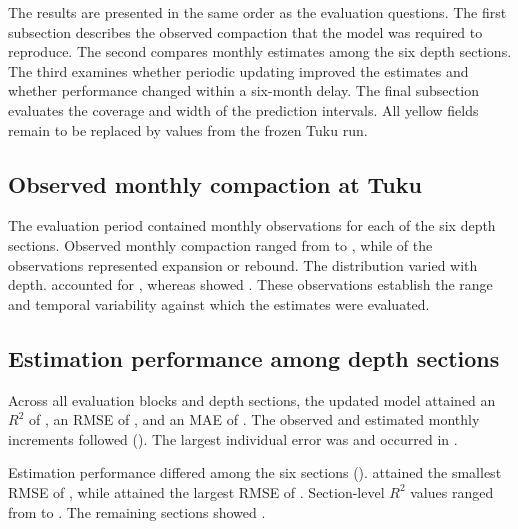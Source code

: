 The results are presented in the same order as the evaluation questions. The first subsection describes the observed compaction that the model was required to reproduce. The second compares monthly estimates among the six depth sections. The third examines whether periodic updating improved the estimates and whether performance changed within a six-month delay. The final subsection evaluates the coverage and width of the prediction intervals. All yellow fields remain to be replaced by values from the frozen Tuku run.

\subsection{Observed monthly compaction at Tuku}
\label{subsec:results_observations}

The evaluation period contained  monthly observations for each of the six depth sections. Observed monthly compaction ranged from  to , while  of the observations represented expansion or rebound. The distribution varied with depth.  accounted for , whereas  showed . These observations establish the range and temporal variability against which the estimates were evaluated.

\subsection{Estimation performance among depth sections}
\label{subsec:results_sections}

Across all evaluation blocks and depth sections, the updated model attained an $R^2$ of , an RMSE of , and an MAE of . The observed and estimated monthly increments followed  (). The largest individual error was  and occurred in .

Estimation performance differed among the six sections ().  attained the smallest RMSE of , while  attained the largest RMSE of . Section-level $R^2$ values ranged from  to . The remaining sections showed .

